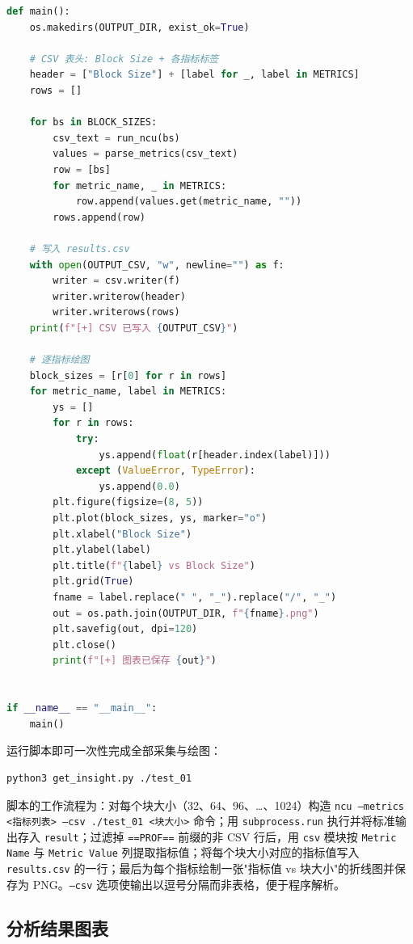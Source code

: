 \begin{lstlisting}[language=Python]
def main():
    os.makedirs(OUTPUT_DIR, exist_ok=True)

    # CSV 表头: Block Size + 各指标标签
    header = ["Block Size"] + [label for _, label in METRICS]
    rows = []

    for bs in BLOCK_SIZES:
        csv_text = run_ncu(bs)
        values = parse_metrics(csv_text)
        row = [bs]
        for metric_name, _ in METRICS:
            row.append(values.get(metric_name, ""))
        rows.append(row)

    # 写入 results.csv
    with open(OUTPUT_CSV, "w", newline="") as f:
        writer = csv.writer(f)
        writer.writerow(header)
        writer.writerows(rows)
    print(f"[+] CSV 已写入 {OUTPUT_CSV}")

    # 逐指标绘图
    block_sizes = [r[0] for r in rows]
    for metric_name, label in METRICS:
        ys = []
        for r in rows:
            try:
                ys.append(float(r[header.index(label)]))
            except (ValueError, TypeError):
                ys.append(0.0)
        plt.figure(figsize=(8, 5))
        plt.plot(block_sizes, ys, marker="o")
        plt.xlabel("Block Size")
        plt.ylabel(label)
        plt.title(f"{label} vs Block Size")
        plt.grid(True)
        fname = label.replace(" ", "_").replace("/", "_")
        out = os.path.join(OUTPUT_DIR, f"{fname}.png")
        plt.savefig(out, dpi=120)
        plt.close()
        print(f"[+] 图表已保存 {out}")


if __name__ == "__main__":
    main()
\end{lstlisting}

运行脚本即可一次性完成全部采集与绘图：

\begin{lstlisting}
python3 get_insight.py ./test_01
\end{lstlisting}

脚本的工作流程为：对每个块大小（32、64、96、\ldots、1024）构造 \texttt{ncu --metrics <指标列表> --csv ./test\_01 <块大小>} 命令；用 \texttt{subprocess.run} 执行并将标准输出存入 \texttt{result}；过滤掉 \texttt{==PROF==} 前缀的非 CSV 行后，用 \texttt{csv} 模块按 \texttt{Metric Name} 与 \texttt{Metric Value} 列提取指标值；将每个块大小对应的指标值写入 \texttt{results.csv} 的一行；最后为每个指标绘制一张"指标值 vs 块大小"的折线图并保存为 PNG。\texttt{--csv} 选项使输出以逗号分隔而非表格，便于程序解析。

\subsection{分析结果图表}

